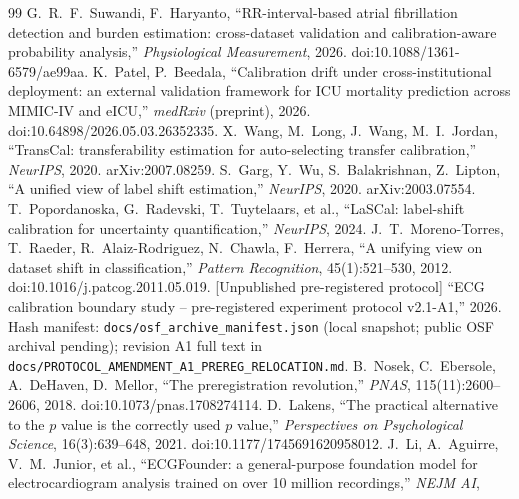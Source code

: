 \begin{thebibliography}{99}
G.~R.~F.~Suwandi, F.~Haryanto, ``RR-interval-based atrial fibrillation
detection and burden estimation: cross-dataset validation and
calibration-aware probability analysis,'' \emph{Physiological
Measurement}, 2026. doi:10.1088/1361-6579/ae99aa.
 K.~Patel, P.~Beedala, ``Calibration drift under
cross-institutional deployment: an external validation framework for
ICU mortality prediction across MIMIC-IV and eICU,'' \emph{medRxiv}
(preprint), 2026. doi:10.64898/2026.05.03.26352335.
 X.~Wang, M.~Long, J.~Wang, M.~I.~Jordan,
``TransCal: transferability estimation for auto-selecting transfer
calibration,'' \emph{NeurIPS}, 2020. arXiv:2007.08259.
 S.~Garg, Y.~Wu, S.~Balakrishnan, Z.~Lipton,
``A unified view of label shift estimation,'' \emph{NeurIPS}, 2020.
arXiv:2003.07554.
 T.~Popordanoska, G.~Radevski, T.~Tuytelaars, et al.,
``LaSCal: label-shift calibration for uncertainty quantification,''
\emph{NeurIPS}, 2024.
 J.~T.~Moreno-Torres, T.~Raeder,
R.~Alaiz-Rodriguez, N.~Chawla, F.~Herrera, ``A unifying view on
dataset shift in classification,'' \emph{Pattern Recognition},
45(1):521--530, 2012. doi:10.1016/j.patcog.2011.05.019.
 [Unpublished pre-registered protocol] ``ECG
calibration boundary study -- pre-registered experiment protocol
v2.1-A1,'' 2026. Hash manifest:
\texttt{docs/osf\_archive\_manifest.json} (local snapshot; public OSF
archival pending); revision A1 full text in
\texttt{docs/PROTOCOL\_AMENDMENT\_A1\_PREREG\_RELOCATION.md}.
 B.~Nosek, C.~Ebersole, A.~DeHaven,
D.~Mellor, ``The preregistration revolution,'' \emph{PNAS},
115(11):2600--2606, 2018. doi:10.1073/pnas.1708274114.
 D.~Lakens, ``The practical alternative to
the $p$ value is the correctly used $p$ value,''
\emph{Perspectives on Psychological Science}, 16(3):639--648, 2021.
doi:10.1177/1745691620958012.
 J.~Li, A.~Aguirre, V.~M.~Junior, et al.,
``ECGFounder: a general-purpose foundation model for electrocardiogram
analysis trained on over 10 million recordings,'' \emph{NEJM AI},

\end{thebibliography}
